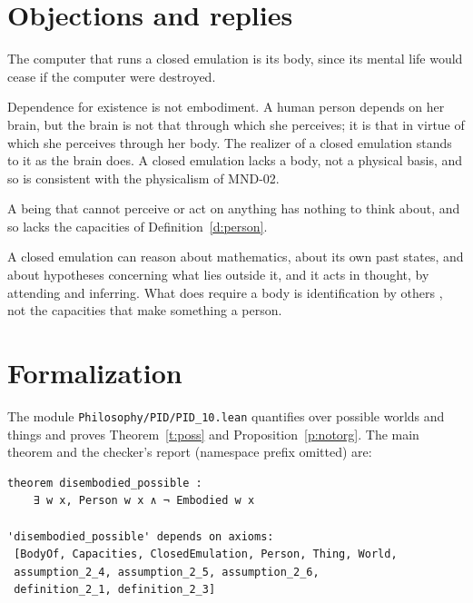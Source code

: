 \documentclass{situationist-preprint}
\begin{document}
\section{Objections and replies}

\begin{objection}
The computer that runs a closed emulation is its body, since its mental life would cease if the computer were destroyed.
\end{objection}

\begin{reply}
Dependence for existence is not embodiment. A human person depends on her brain, but the brain is not that through which she perceives; it is that in virtue of which she perceives through her body. The realizer of a closed emulation stands to it as the brain does. A closed emulation lacks a body, not a physical basis, and so is consistent with the physicalism of MND-02.
\end{reply}

\begin{objection}
A being that cannot perceive or act on anything has nothing to think about, and so lacks the capacities of Definition~\ref{d:person}.
\end{objection}

\begin{reply}
A closed emulation can reason about mathematics, about its own past states, and about hypotheses concerning what lies outside it, and it acts in thought, by attending and inferring. What does require a body is identification by others \citep{Strawson1959}, not the capacities that make something a person.
\end{reply}

\section{Formalization}\label{s:formal}

The module \nolinkurl{Philosophy/PID/PID_10.lean} quantifies over possible worlds and things and proves Theorem~\ref{t:poss} and Proposition~\ref{p:notorg}. The main theorem and the checker's report (namespace prefix omitted) are:

\begin{lstlisting}
theorem disembodied_possible :
    ∃ w x, Person w x ∧ ¬ Embodied w x

'disembodied_possible' depends on axioms:
 [BodyOf, Capacities, ClosedEmulation, Person, Thing, World,
 assumption_2_4, assumption_2_5, assumption_2_6,
 definition_2_1, definition_2_3]
\end{lstlisting}
\end{document}

